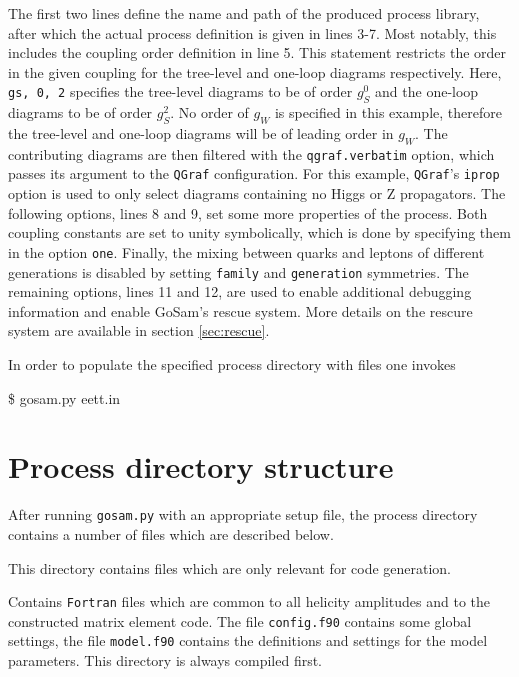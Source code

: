 \documentclass[11pt,a4paper]{refrep}
\newcommand{\gosam}{{\sc GoSam}\xspace}
\newcommand{\qgraf}{{\tt QGraf}\xspace}
\begin{document}
The first two lines define the name and path of the produced process library, after which the actual process definition is given in lines 3-7. Most notably, this includes the coupling order definition in line 5. This statement restricts the order in the given coupling for the tree-level and one-loop diagrams respectively. Here, \texttt{gs, 0, 2} specifies the tree-level diagrams to be of order $g_S^0$ and the one-loop diagrams to be of order $g_S^2$. No order of $g_W$ is specified in this example, therefore the tree-level and one-loop diagrams will be of leading order in $g_W$. The contributing diagrams are then filtered with the \texttt{qgraf.verbatim} option, which passes its argument to the \qgraf configuration. For this example, \qgraf's \texttt{iprop} option is used to only select diagrams containing no Higgs or Z propagators.
The following options, lines 8 and 9, set some more properties of the process. Both coupling constants are set to unity symbolically, which is done by specifying them in the option \texttt{one}. Finally, the mixing between quarks and leptons of different generations is disabled by setting \texttt{family} and \texttt{generation} symmetries. The remaining options, lines 11 and 12, are used to enable additional debugging information and enable \gosam's rescue system. More details on the rescure system are available in section \ref{sec:rescue}.

In order to populate the specified process directory with files
one invokes
\begin{example}
\$ gosam.py eett.in
\end{example}

\section{Process directory structure}



After running \texttt{gosam.py} with an appropriate setup file, the
process directory contains a number of files which are described below.

 This directory contains files which are only
relevant for code ge\-ne\-ration.

 Contains {\tt Fortran} files which are common to all helicity
amplitudes and to the constructed matrix element code. 
The file {\tt config.f90} contains some global  settings, the file {\tt model.f90}
contains the definitions and settings for the model parameters.
This directory is always compiled first.
\end{document}
